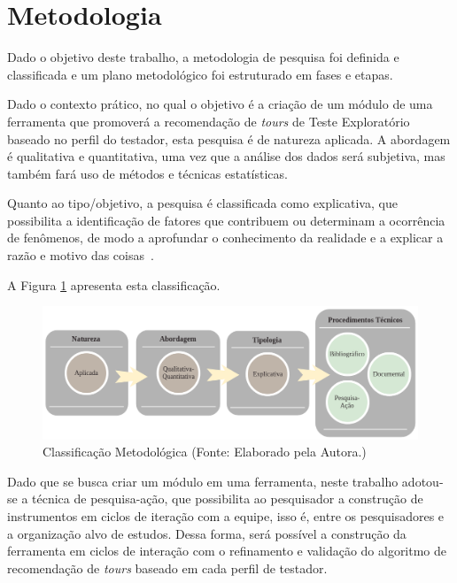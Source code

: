\section{Metodologia}

Dado o objetivo deste trabalho, a metodologia de pesquisa foi definida e classificada e um plano metodológico foi estruturado em fases e etapas.

Dado o contexto prático, no qual o objetivo é a criação de um módulo de uma ferramenta que promoverá a recomendação de \textit{tours} de Teste Exploratório baseado no perfil do testador, esta pesquisa é de natureza aplicada. A abordagem é qualitativa e quantitativa, uma vez que a análise dos dados será subjetiva, mas também fará uso de métodos e técnicas estatísticas.

Quanto ao tipo/objetivo, a pesquisa é classificada como explicativa, que possibilita a identificação de fatores que contribuem ou determinam a ocorrência de fenômenos, de modo a aprofundar o conhecimento da realidade e a explicar a razão e motivo das coisas~\cite{gil2002elaborar}. 

A Figura \ref{fig:classificacaoMetodologica}  apresenta esta classificação.

        \begin{figure}[h]
          \centering
          \includegraphics[width=14cm]{figuras/classificacaoMetodologica.png}
          \caption{Classificação Metodológica (Fonte: Elaborado pela Autora.)} 
          \label{fig:classificacaoMetodologica}
        
        \end{figure}
        
Dado que se busca criar um módulo em uma ferramenta, neste trabalho adotou-se a técnica de pesquisa-ação, que possibilita
ao pesquisador a construção de instrumentos em ciclos de iteração com a equipe, isso é, entre os pesquisadores e a organização alvo de estudos. Dessa forma, será possível a construção da ferramenta em ciclos de interação com o refinamento e validação do algoritmo de recomendação de \textit{tours} baseado em cada perfil de testador.

